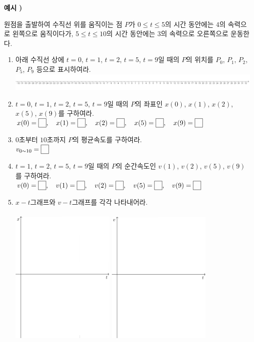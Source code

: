 \documentclass{oblivoir}
\newcounter{num}
\newcommand\exam[1]
{\bigskip\par\noindent\stepcounter{num} \textbf{예시 \thenum) #1}\par\noindent}
\newcommand\pb[1]{\ensuremath{\fbox{\phantom{#1}}}}
\begin{document}
\clearpage
%
\exam{}
원점을 출발하여 수직선 위를 움직이는 점 \(P\)가 \(0\le t\le 5\)의 시간 동안에는 \(4\)의 속력으로 왼쪽으로 움직이다가, \(5\le t\le 10\)의 시간 동안에는 \(3\)의 속력으로 오른쪽으로 운동한다.
\begin{enumerate}[label=(\(\arabic*\))]
\item
아래 수직선 상에 \(t=0\), \(t=1\), \(t=2\), \(t=5\), \(t=9\)일 때의 \(P\)의 위치를 \(P_0\), \(P_1\), \(P_2\), \(P_5\), \(P_9\) 등으로 표시하여라.\\
\includegraphics[width=1.3\textwidth]{line2}
\item
\(t=0\), \(t=1\), \(t=2\), \(t=5\), \(t=9\)일 때의 \(P\)의 좌표인 \(x(0)\), \(x(1)\), \(x(2)\), \(x(5)\), \(x(9)\)를 구하여라.\\
\(x(0)=\pb{1},\quad x(1)=\pb{1},\quad x(2)=\pb{1},\quad x(5)=\pb{1},\quad x(9)=\pb{1}\)
\item
\(0\)초부터 \(10\)초까지 \(P\)의 평균속도를 구하여라.\\
\(v_{0\sim10}=\pb{1}\)
\item
\(t=1\), \(t=2\), \(t=5\), \(t=9\)일 때의 \(P\)의 순간속도인 \(v(1)\), \(v(2)\), \(v(5)\), \(v(9)\)를 구하여라.\\
\(v(0)=\pb{1},\quad v(1)=\pb{1},\quad v(2)=\pb{1},\quad v(5)=\pb{1},\quad v(9)=\pb{1}\)
\item
\(x-t\)그래프와 \(v-t\)그래프를 각각 나타내어라.\\\\
\includegraphics[width=0.4\textwidth]{xt}\qquad\qquad
\includegraphics[width=0.4\textwidth]{vt}

\end{enumerate}
\end{document}
